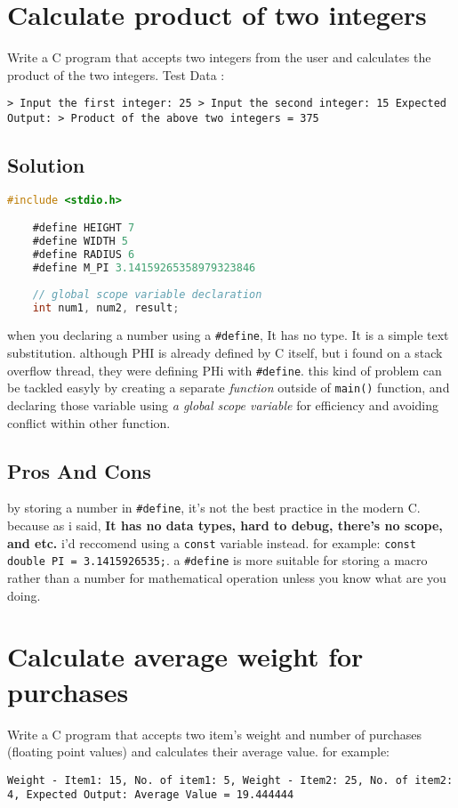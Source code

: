 \documentclass{article}
\begin{document}
  \section{Calculate product of two integers}
  Write a C program that accepts two integers from the user and calculates the product of the two integers.
  Test Data :
  
  \begin{center}
  \parbox{0.8\textwidth}{
    \texttt{> Input the first integer: 25
  > Input the second integer: 15
  Expected Output:
  > Product of the above two integers = 375
    }
  }
  \end{center}
  \subsection{Solution}
  \begin{lstlisting}[language=C, caption=1.1 Code Solution]
    #include <stdio.h>

    #define HEIGHT 7
    #define WIDTH 5
    #define RADIUS 6
    #define M_PI 3.14159265358979323846
    
    // global scope variable declaration
    int num1, num2, result;
  \end{lstlisting}
  when you declaring a number using a \texttt{\#define}, It has no type. It is a simple text substitution. although PHI is already defined by C itself, but i found on a stack overflow thread, they were defining PHi with \texttt{\#define}.
  this kind of problem can be tackled easyly by creating a separate \textit{function} outside of \texttt{main()} function, and declaring those variable using \textit{a global scope variable} for efficiency and avoiding conflict within other function. 

  \subsection{Pros And Cons}
  by storing a number in \texttt{\#define}, it's not the best practice in the modern C. because as i said, \textbf{It has no data types, hard to debug, there's no scope, and etc.} 
  i'd reccomend using a \texttt{const} variable instead. for example: \texttt{const double PI = 3.1415926535;}. a \texttt{\#define} is more suitable for storing a macro rather than a number for mathematical operation unless you know what are you doing.
  
  \section{Calculate average weight for purchases} 
  Write a C program that accepts two item's weight and number of purchases (floating point values) and calculates their average value.
  for example: 
  \begin{center}
  \parbox{0.8\textwidth}{
    \texttt{Weight - Item1: 15, No. of item1: 5, Weight - Item2: 25, No. of item2: 4, Expected Output: Average Value = 19.444444}
  }
  \end{center}
\end{document}
